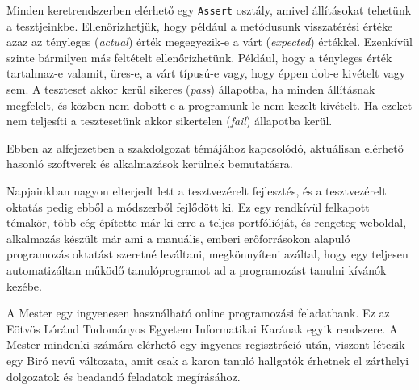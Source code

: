 Minden keretrendszerben elérhető egy \texttt{Assert} osztály, amivel állításokat tehetünk a tesztjeinkbe. Ellenőrizhetjük, hogy például a metódusunk visszatérési értéke azaz az tényleges (\emph{actual}) érték megegyezik-e a várt (\emph{expected}) értékkel. Ezenkívül szinte bármilyen más feltételt ellenőrizhetünk. Például, hogy a tényleges érték tartalmaz-e valamit, üres-e, a várt típusú-e vagy, hogy éppen dob-e kivételt vagy sem. A teszteset akkor kerül sikeres (\emph{pass}) állapotba, ha minden állításnak megfelelt, és közben nem dobott-e a programunk le nem kezelt kivételt. Ha ezeket nem teljesíti a tesztesetünk akkor sikertelen (\emph{fail}) állapotba kerül.



Ebben az alfejezetben a szakdolgozat témájához kapcsolódó, aktuálisan elérhető hasonló szoftverek és alkalmazások kerülnek bemutatásra.

Napjainkban nagyon elterjedt lett a tesztvezérelt fejlesztés, és a tesztvezérelt oktatás pedig ebből a módszerből fejlődött ki. Ez egy rendkívül felkapott témakör, több cég építette már ki erre a teljes portfólióját, és rengeteg weboldal, alkalmazás készült már ami a manuális, emberi erőforrásokon alapuló programozás oktatást szeretné leváltani, megkönnyíteni azáltal, hogy egy teljesen automatizáltan működő tanulóprogramot ad a programozást tanulni kívánók kezébe.


A Mester egy ingyenesen használható online programozási feladatbank. Ez az Eötvös Lóránd Tudományos Egyetem Informatikai Karának egyik rendszere. \cite{elte-mester} A Mester mindenki számára elérhető egy ingyenes regisztráció után, viszont létezik egy Biró nevű változata, amit csak a karon tanuló hallgatók érhetnek el zárthelyi dolgozatok és beadandó feladatok megírásához. \cite{elte-biro}

